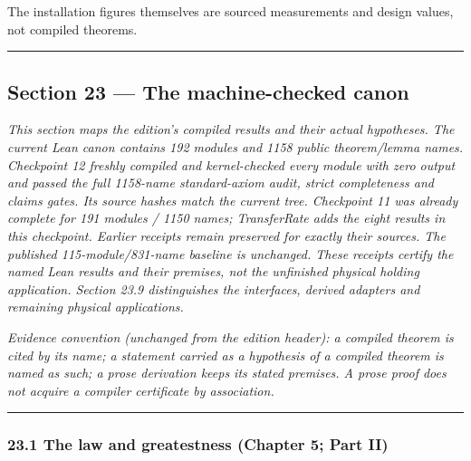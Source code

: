 \documentclass[
]{article}
\begin{document}
The installation figures themselves are sourced measurements and design
values, not compiled theorems.

\begin{center}\rule{0.5\linewidth}{0.5pt}\end{center}

\subsection{Section 23 --- The machine-checked
canon}\label{section-23-the-machine-checked-canon}

\emph{This section maps the edition's compiled results and their actual
hypotheses. The current Lean canon contains 192 modules and 1158 public
theorem/lemma names. Checkpoint 12 freshly compiled and kernel-checked
every module with zero output and passed the full 1158-name
standard-axiom audit, strict completeness and claims gates. Its source
hashes match the current tree. Checkpoint 11 was already complete for
191 modules / 1150 names; TransferRate adds the eight results in this
checkpoint. Earlier receipts remain preserved for exactly their sources.
The published
1\allowbreak{}1\allowbreak{}5\allowbreak{}-\allowbreak{}m\allowbreak{}o\allowbreak{}d\allowbreak{}u\allowbreak{}l\allowbreak{}e\allowbreak{}/\allowbreak{}8\allowbreak{}3\allowbreak{}1\allowbreak{}-\allowbreak{}n\allowbreak{}a\allowbreak{}m\allowbreak{}e
baseline is unchanged. These receipts certify the named Lean results and
their premises, not the unfinished physical holding application. Section
23.9 distinguishes the interfaces, derived adapters and remaining
physical applications.}

\emph{Evidence convention (unchanged from the edition header): a
compiled theorem is cited by its name; a statement carried as a
hypothesis of a compiled theorem is named as such; a prose derivation
keeps its stated premises. A prose proof does not acquire a compiler
certificate by association.}

\begin{center}\rule{0.5\linewidth}{0.5pt}\end{center}

\subsubsection{23.1 The law and greatestness (Chapter 5; Part
II)}\label{the-law-and-greatestness-chapter-5-part-ii}
\end{document}
